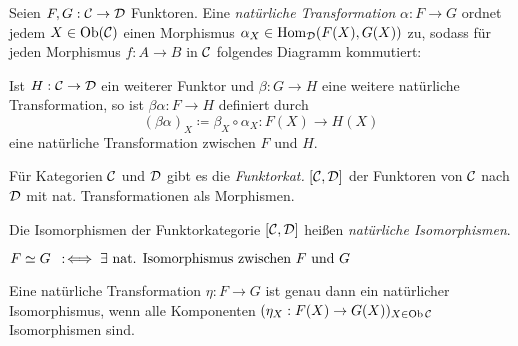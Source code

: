 \documentclass{cheat-sheet}
\begin{document}
\begin{defn}
  Seien $F, G : \mathcal{C} \to \mathcal{D}$ Funktoren. Eine \emph{natürliche Transformation} $\alpha : F \to G$ ordnet jedem $X \in \operatorname{Ob}(\mathcal{C})$ einen Morphismus $\alpha_X \in \operatorname{Hom}_{\mathcal{D}}(F(X), G(X))$ zu, sodass für jeden Morphismus $f : A \to B$ in $\mathcal{C}$ folgendes Diagramm kommutiert:
  \begin{center}
    \vspace{-4pt}
    \vspace{-4pt}
  \end{center}
\end{defn}

\begin{bem}
  Ist $H : \mathcal{C} \to \mathcal{D}$ ein weiterer Funktor und $\beta : G \to H$ eine weitere natürliche Transformation, so ist $\beta \alpha : F \to H$ definiert durch
  \[ (\beta \alpha)_X \coloneqq \beta_X \circ \alpha_X : F(X) \to H(X) \]
  eine natürliche Transformation zwischen $F$ und $H$.
\end{bem}

\begin{bem}
  Für Kategorien $\mathcal{C}$ und $\mathcal{D}$ gibt es die \emph{Funktorkat.} $\left[\mathcal{C}, \mathcal{D}\right]$ der Funktoren von $\mathcal{C}$ nach $\mathcal{D}$ mit nat. Transformationen als Morphismen.
\end{bem}

\begin{defn}
  Die Isomorphismen der Funktorkategorie $\left[\mathcal{C}, \mathcal{D}\right]$ heißen \emph{natürliche Isomorphismen}.
\end{defn}

\begin{nota}
  $F \simeq G \enspace:\!\iff \exists \text{ nat. Isomorphismus zwischen $F$ und $G$}$
\end{nota}

\begin{lem}
  Eine natürliche Transformation $\eta : F \to G$ ist genau dann ein natürlicher Isomorphismus, wenn alle Komponenten $(\eta_X : F(X) \to G(X))_{X \in \operatorname{Ob} \mathcal{C}}$ Isomorphismen sind.
\end{lem}
\end{document}
